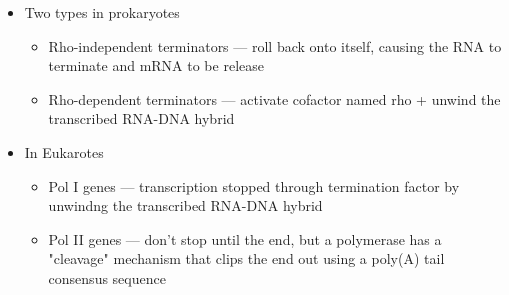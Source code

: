 \documentclass[letterpaper]{article}
\begin{document}
\begin{itemize}
\item Two types in prokaryotes

\begin{itemize}
\item Rho-independent terminators --- roll back onto itself, causing the
RNA to terminate and mRNA to be release
\item Rho-dependent terminators --- activate cofactor named rho + unwind
the transcribed RNA-DNA hybrid
\end{itemize}

\item In Eukarotes

\begin{itemize}
\item Pol I genes --- transcription stopped through termination factor by
unwindng the transcribed RNA-DNA hybrid
\item Pol II genes --- don't stop until the end, but a polymerase has a
"cleavage" mechanism that clips the end out using a poly(A) tail
consensus sequence
\end{itemize}
\end{itemize}
\end{document}
